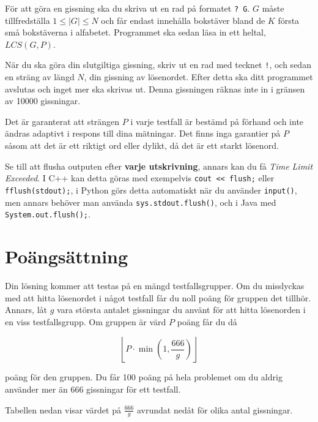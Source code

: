 För att göra en gissning ska du skriva ut en rad på formatet \texttt{? G}. $G$ måste tillfredställa $1 \le |G| \le N$
och får endast innehålla bokstäver bland de $K$ första små bokstäverna i alfabetet.
Programmet ska sedan läsa in ett heltal, $LCS(G,P)$.

När du ska göra din slutgiltiga gissning, skriv ut en rad med tecknet \texttt{!}, och sedan en sträng av längd $N$,
din gissning av lösenordet. Efter detta ska ditt programmet avslutas och inget mer ska skrivas ut.
Denna gissningen räknas inte in i gränsen av 10000 gissningar.

Det är garanterat att strängen $P$ i varje testfall är bestämd på förhand och inte ändras adaptivt i respons
till dina mätningar. Det finns inga garantier på $P$ såsom att det är ett riktigt ord eller dylikt, då det är
ett starkt lösenord. 


Se till att flusha outputen efter \textbf{varje utskrivning}, annars kan du få \textit{Time Limit Exceeded}.
I C++ kan detta göras med exempelvis \texttt{cout << flush;}
eller \texttt{fflush(stdout);},
i Python görs detta automatiskt när du använder \texttt{input()}, men annars behöver man använda
\texttt{sys.stdout.flush()}, och i Java med \texttt{System.out.flush();}.

\section*{Poängsättning}
Din lösning kommer att testas på en mängd testfallsgrupper. Om du misslyckas med att
hitta lösenordet i något testfall får du noll poäng för gruppen det tillhör. Annars, låt
$g$ vara största antalet gissningar du använt för att hitta lösenorden i en viss testfallsgrupp.
Om gruppen är värd $P$ poäng får du då

$$\left \lfloor{P \cdot \min(1, \frac{666}{g})}\right \rfloor $$

poäng för den gruppen. Du får 100 poäng på hela problemet om du aldrig använder mer än $666$ gissningar
för ett testfall.

Tabellen nedan visar värdet på $\frac{666}{g}$ avrundat nedåt för olika antal gissningar.

